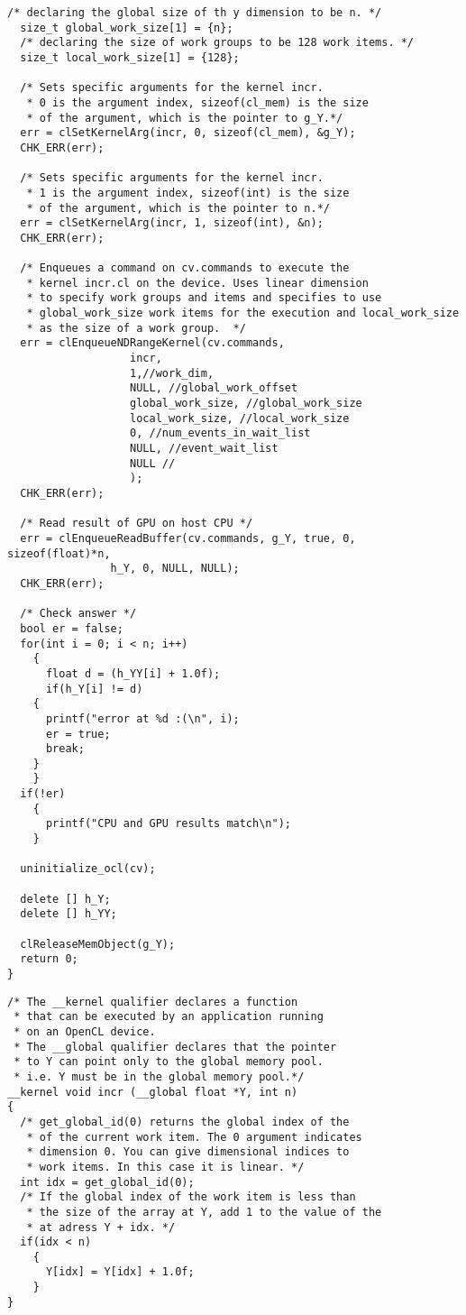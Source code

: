 \documentclass[11pt,letter]{article}
\begin{document}
\begin{lstlisting}[label=some-code,caption=incr.cpp ]
  /* declaring the global size of th y dimension to be n. */
  size_t global_work_size[1] = {n};
  /* declaring the size of work groups to be 128 work items. */
  size_t local_work_size[1] = {128};

  /* Sets specific arguments for the kernel incr.
   * 0 is the argument index, sizeof(cl_mem) is the size
   * of the argument, which is the pointer to g_Y.*/
  err = clSetKernelArg(incr, 0, sizeof(cl_mem), &g_Y);
  CHK_ERR(err);

  /* Sets specific arguments for the kernel incr.
   * 1 is the argument index, sizeof(int) is the size
   * of the argument, which is the pointer to n.*/
  err = clSetKernelArg(incr, 1, sizeof(int), &n);
  CHK_ERR(err);

  /* Enqueues a command on cv.commands to execute the
   * kernel incr.cl on the device. Uses linear dimension
   * to specify work groups and items and specifies to use
   * global_work_size work items for the execution and local_work_size
   * as the size of a work group.  */
  err = clEnqueueNDRangeKernel(cv.commands,
			       incr,
			       1,//work_dim,
			       NULL, //global_work_offset
			       global_work_size, //global_work_size
			       local_work_size, //local_work_size
			       0, //num_events_in_wait_list
			       NULL, //event_wait_list
			       NULL //
			       );
  CHK_ERR(err);

  /* Read result of GPU on host CPU */
  err = clEnqueueReadBuffer(cv.commands, g_Y, true, 0, sizeof(float)*n,
			    h_Y, 0, NULL, NULL);
  CHK_ERR(err);

  /* Check answer */
  bool er = false;
  for(int i = 0; i < n; i++)
    {
      float d = (h_YY[i] + 1.0f);
      if(h_Y[i] != d)
	{
	  printf("error at %d :(\n", i);
	  er = true;
	  break;
	}
    }
  if(!er)
    {
      printf("CPU and GPU results match\n");
    }

  uninitialize_ocl(cv);

  delete [] h_Y;
  delete [] h_YY;

  clReleaseMemObject(g_Y);
  return 0;
}
\end{lstlisting}


\begin{lstlisting}[label=some-code,caption=incr.cl ]
/* The __kernel qualifier declares a function
 * that can be executed by an application running
 * on an OpenCL device.
 * The __global qualifier declares that the pointer
 * to Y can point only to the global memory pool.
 * i.e. Y must be in the global memory pool.*/
__kernel void incr (__global float *Y, int n)
{
  /* get_global_id(0) returns the global index of the
   * of the current work item. The 0 argument indicates
   * dimension 0. You can give dimensional indices to
   * work items. In this case it is linear. */
  int idx = get_global_id(0);
  /* If the global index of the work item is less than
   * the size of the array at Y, add 1 to the value of the
   * at adress Y + idx. */
  if(idx < n)
    {
      Y[idx] = Y[idx] + 1.0f;
    }
}

\end{lstlisting}
\end{document}
